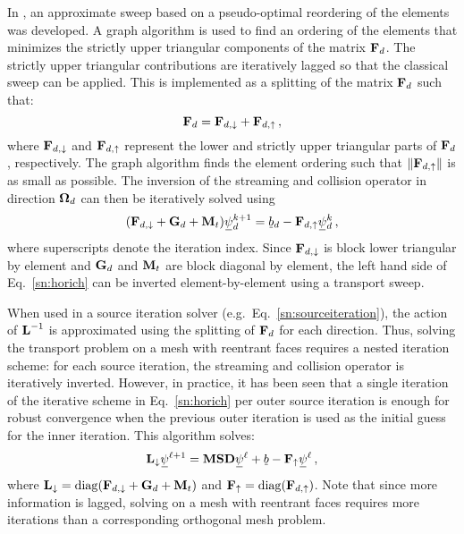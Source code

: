 \documentclass[../doc.tex]{subfiles}
\begin{document}
In \textcite{graph_sweeps}, an approximate sweep based on a pseudo-optimal reordering of the elements was developed. A graph algorithm is used to find an ordering of the elements that minimizes the strictly upper triangular components of the matrix $\boldsymbol{\mathrm{F}}_d$. The strictly upper triangular contributions are iteratively lagged so that the classical sweep can be applied. This is implemented as a splitting of the matrix $\boldsymbol{\mathrm{F}}_d$ such that: 
	\begin{equation}
		\boldsymbol{\mathrm{F}}_d = \boldsymbol{\mathrm{F}}_{d,\downarrow} + \boldsymbol{\mathrm{F}}_{d,\uparrow} \,,
	\end{equation}
where $\boldsymbol{\mathrm{F}}_{d,\downarrow}$ and $\boldsymbol{\mathrm{F}}_{d,\uparrow}$ represent the lower and strictly upper triangular parts of $\boldsymbol{\mathrm{F}}_d$, respectively. The graph algorithm finds the element ordering such that $\|\boldsymbol{\mathrm{F}}_{d,\uparrow}\|$ is as small as possible. The inversion of the streaming and collision operator in direction $\boldsymbol{\Omega}_d$ can then be iteratively solved using 
	\begin{equation} \label{sn:horich}
		(\mat{F}_{d,\downarrow} + \mat{G}_d + \mat{M}_t)\ubar{\psi}_d^{k+1} = \ubar{b}_d - \mat{F}_{d,\uparrow}\ubar{\psi}_d^{k} \,,
	\end{equation}
where superscripts denote the iteration index. Since $\boldsymbol{\mathrm{F}}_{d,\downarrow}$ is block lower triangular by element and $\boldsymbol{\mathrm{G}}_d$ and $\boldsymbol{\mathrm{M}}_t$ are block diagonal by element, the left hand side of Eq.~\ref{sn:horich} can be inverted element-by-element using a transport sweep. 

When used in a source iteration solver (e.g.~Eq.~\ref{sn:sourceiteration}), the action of $\boldsymbol{\mathrm{L}}^{-1}$ is approximated using the splitting of $\boldsymbol{\mathrm{F}}_d$ for each direction. Thus, solving the transport problem on a mesh with reentrant faces requires a nested iteration scheme: for each source iteration, the streaming and collision operator is iteratively inverted. However, in practice, it has been seen that a single iteration of the iterative scheme in Eq.~\ref{sn:horich} per outer source iteration is enough for robust convergence when the previous outer iteration is used as the initial guess for the inner iteration. This algorithm solves:
	\begin{equation}
		\mat{L}_{\downarrow} \ubar{\psi}^{\ell+1} = \mat{M}\mat{S}\mat{D}\ubar{\psi}^\ell + \ubar{b} - \mat{F}_{\uparrow} \ubar{\psi}^\ell \,, 
	\end{equation}
where $\boldsymbol{\mathrm{L}}_{\downarrow} = \operatorname{diag}(\boldsymbol{\mathrm{F}}_{d,\downarrow} + \boldsymbol{\mathrm{G}}_d + \boldsymbol{\mathrm{M}}_t)$ and $\boldsymbol{\mathrm{F}}_{\uparrow} = \operatorname{diag}(\boldsymbol{\mathrm{F}}_{d,\uparrow})$. 
Note that since more information is lagged, solving on a mesh with reentrant faces requires more iterations than a corresponding orthogonal mesh problem. 
\end{document}
